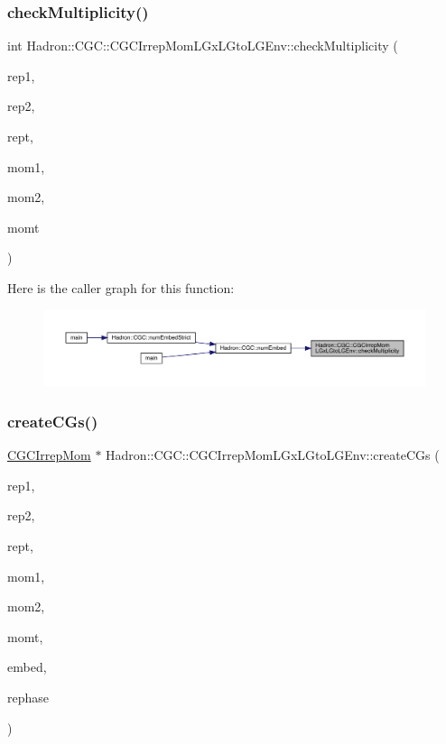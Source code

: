 \subsubsection{\texorpdfstring{checkMultiplicity()}{checkMultiplicity()}}
{\footnotesize\ttfamily int Hadron\+::\+C\+G\+C\+::\+C\+G\+C\+Irrep\+Mom\+L\+Gx\+L\+Gto\+L\+G\+Env\+::check\+Multiplicity (\begin{DoxyParamCaption}\item[{const std\+::string \&}]{rep1,  }\item[{const std\+::string \&}]{rep2,  }\item[{const std\+::string \&}]{rept,  }\item[{const Array\+Int \&}]{mom1,  }\item[{const Array\+Int \&}]{mom2,  }\item[{const Array\+Int \&}]{momt }\end{DoxyParamCaption})}

Here is the caller graph for this function\+:
\nopagebreak
\begin{figure}[H]
\begin{center}
\leavevmode
\includegraphics[width=350pt]{dd/d8a/namespaceHadron_1_1CGC_1_1CGCIrrepMomLGxLGtoLGEnv_ac903fc6025ce80a33975cbd2b635e7df_icgraph}
\end{center}
\end{figure}
\mbox{\label{namespaceHadron_1_1CGC_1_1CGCIrrepMomLGxLGtoLGEnv_aac28a74a71012455c31bc9ba558b35da}} 
\subsubsection{\texorpdfstring{createCGs()}{createCGs()}}
{\footnotesize\ttfamily \mbox{\hyperlink{classHadron_1_1CGCIrrepMom}{C\+G\+C\+Irrep\+Mom}} $\ast$ Hadron\+::\+C\+G\+C\+::\+C\+G\+C\+Irrep\+Mom\+L\+Gx\+L\+Gto\+L\+G\+Env\+::create\+C\+Gs (\begin{DoxyParamCaption}\item[{const std\+::string \&}]{rep1,  }\item[{const std\+::string \&}]{rep2,  }\item[{const std\+::string \&}]{rept,  }\item[{const Array\+Int \&}]{mom1,  }\item[{const Array\+Int \&}]{mom2,  }\item[{const Array\+Int \&}]{momt,  }\item[{int}]{embed,  }\item[{bool}]{rephase }\end{DoxyParamCaption})}

